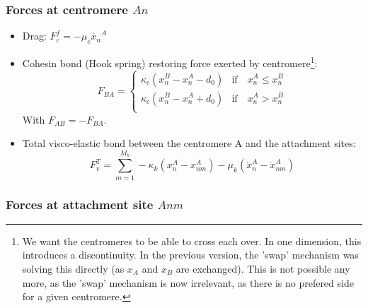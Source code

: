 \documentclass[a4paper,12pt]{article}
\renewcommand{\leq}{\leqslant}
\begin{document}
\subsubsection{Forces at centromere $An$}

\begin{itemize}
\item Drag: $F_c^f = -\mu_c \dot{x_n}^A$
\item Cohesin bond (Hook spring) restoring force exerted by
  centromere\footnote{We want the centromeres to be able to cross each
    over. In one dimension, this introduces a discontinuity. In the
    previous version, the 'swap' mechanism was solving this directly
    (as $x_A$ and $x_B$ are exchanged). This is not possible any more,
    as the 'swap' mechanism is now irrelevant, as there is no prefered
    side for a given centromere.}:
  \begin{equation}
    F_{BA} =
    \begin{cases}
      \kappa_c (x_n^B - x_n^A - d_0) &\mathrm{if}\quad x_n^A \leq x_n^B\\
      \kappa_c (x_n^B - x_n^A + d_0) &\mathrm{if}\quad  x_n^A > x_n^B\\
    \end{cases}
  \end{equation}
  With $F_{AB} = - F_{BA}$. 
\item Total visco-elastic bond between the centromere A and the attachment
  sites:
  $$ F_v^T = \sum_{m = 1}^{M_k} -\kappa_k(x_n^A - x_{nm}^A) 
  - \mu_k(\dot{x}_n^A - \dot{x}_{nm}^A) $$
\end{itemize}


\subsubsection{Forces at attachment site $Anm$}
\end{document}
